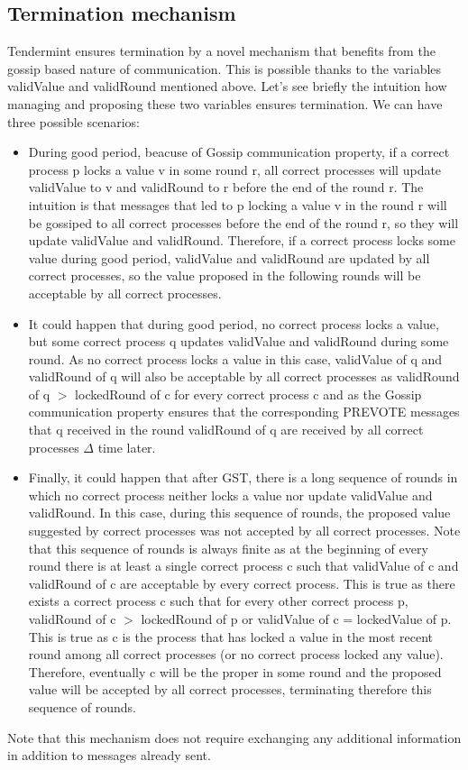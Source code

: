 \documentclass{article}
\begin{document}
	\subsection{Termination mechanism}
	Tendermint ensures termination by a novel mechanism that benefits from the gossip based nature of communication. This is possible thanks to the variables validValue and validRound mentioned above. Let's see briefly the intuition how managing and proposing these two variables ensures termination. 
We can have three possible scenarios:
\begin{itemize}
	 	\item During good period, beacuse of Gossip communication property, if a correct process p locks a value v in some round r, all correct processes will update validValue to v and validRound to r before the end of the round r. The intuition is that messages that led to p locking a value v in the round r will be gossiped to all correct processes before the end of the round r, so they will update validValue and validRound. Therefore, if a correct process locks some value during good period, validValue and validRound are updated by all correct processes, so the value proposed in the following rounds will be acceptable by all correct processes.
	 	\item It could happen that during good
period, no correct process locks a value, but some correct process q updates validValue and validRound during some round. As no correct process locks a value in this case, validValue of q and validRound of q will also be acceptable by all correct processes as validRound of q $>$ lockedRound of c for every correct process c and as the Gossip communication property ensures that the corresponding PREVOTE messages that q received in the round validRound of q are received by all correct processes $\Delta$ time later.
          \item Finally, it could happen that after GST, there is a long sequence of rounds in which no correct process neither locks a value nor update validValue and validRound. In this case, during this sequence of rounds, the proposed value suggested by correct processes was not accepted by all correct processes. Note that this sequence of rounds is always finite as at the beginning of every round there is at least a single correct process c such that validValue of c and validRound of c are acceptable by every correct process. This is true as there exists a correct process c such that for every other correct process p, validRound of c $>$ lockedRound of p or validValue of c = lockedValue of p. This is true as c is the process that has locked a value in the most recent round among all correct processes (or no correct process locked any value). Therefore, eventually c will be the proper in some round and the proposed value will be accepted by all correct processes, terminating therefore this sequence of rounds.
	\end{itemize}
Note that this mechanism does not require exchanging any additional information in addition to messages already sent.
	\newpage
	\newpage
\end{document}
